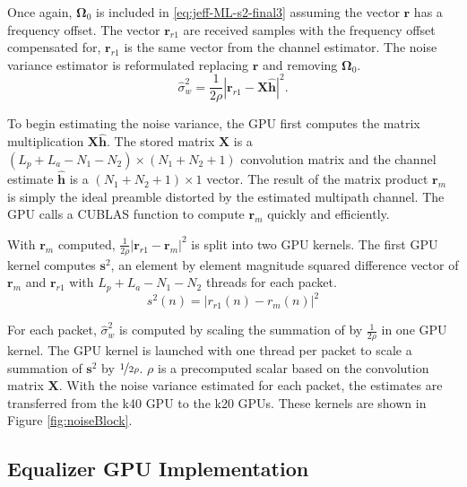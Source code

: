 Once again, $\boldsymbol{\Omega}_0$ is included in \eqref{eq:jeff-ML-s2-final3} assuming the vector $\mathbf{r}$ has a frequency offset.
The vector $\mathbf{r}_{r1}$ are received samples with the frequency offset compensated for, $\mathbf{r}_{r1}$ is the same vector from the channel estimator.
The noise variance estimator is reformulated replacing $\mathbf{r}$ and removing $\boldsymbol{\Omega}_0$.
\begin{equation}
	\hat{\sigma}_w^2 = \frac{1}{2\rho} \left| \mathbf{r}_{r1}-\mathbf{X}\hat{\mathbf{h}}\right|^2.
	\label{eq:noise_var_reformed}
\end{equation}

To begin estimating the noise variance, the GPU first computes the matrix multiplication $\mathbf{X}\hat{\mathbf{h}}$.
The stored matrix $\mathbf{X}$ is a $(L_p+L_a-N_1-N_2)\times (N_1+N_2+1)$ convolution matrix and the channel estimate $\hat{\mathbf{h}}$ is a $(N_1+N_2+1)\times1$ vector.
The result of the matrix product $\mathbf{r}_m$ is simply the ideal preamble distorted by the estimated multipath channel.
The GPU calls a CUBLAS function to compute $\mathbf{r}_m$ quickly and efficiently.

With $\mathbf{r}_m$ computed, $\frac{1}{2\rho} \left| \mathbf{r}_{r1}-\mathbf{r}_m\right|^2$ is split into two GPU kernels.
The first GPU kernel computes $\mathbf{s}^2$, an element by element magnitude squared difference vector of $\mathbf{r}_{m}$ and $\mathbf{r}_{r1}$ with $L_p+L_a-N_1-N_2$ threads for each packet.
\begin{equation}
s^2(n) = \left| r_{r1}(n)- r_m(n) \right|^2
\end{equation}

For each packet, $\hat{\sigma}_w^2$ is computed by scaling the summation of by $\frac{1}{2\rho}$ in one GPU kernel.
The GPU kernel is launched with one thread per packet to scale a summation of $\mathbf{s}^2$ by $\nicefrac{1}{2\rho}$.
$\rho$ is a precomputed scalar based on the convolution matrix $\mathbf{X}$.
With the noise variance estimated for each packet, the estimates are transferred from the k40 GPU to the k20 GPUs.
These kernels are shown in Figure \ref{fig:noiseBlock}.


\subsection{Equalizer GPU Implementation}


